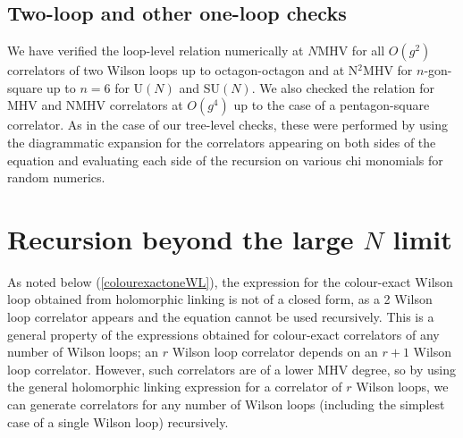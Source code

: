 \documentclass[12pt]{article}
\numberwithin{equation}{section}
\begin{document}
\subsection{Two-loop and other one-loop checks}

We have verified the loop-level relation numerically at $N$MHV for all $O(g^2)$ correlators of two Wilson loops up to octagon-octagon and at N$^2$MHV for $n$-gon-square up to $n=6$ for U$(N)$ and SU$(N)$. We also checked the relation for MHV and NMHV correlators at $O(g^4)$ up to the case of a pentagon-square correlator. As in the case of our tree-level checks, these were performed by using the diagrammatic expansion for the correlators appearing on both sides of the equation and evaluating each side of the recursion on various chi monomials for random numerics. 

\section{Recursion beyond the large \texorpdfstring{$N$}{N} limit}
As noted below (\ref{colourexactoneWL}), the expression for the colour-exact Wilson loop obtained from holomorphic linking is not of a closed form, as a 2 Wilson loop correlator appears and the equation cannot be used recursively. This is a general property of the expressions obtained for colour-exact correlators of any number of Wilson loops; an $r$ Wilson loop correlator depends on an $r+1$ Wilson loop correlator. However, such correlators are of a lower MHV degree, so by using the general holomorphic linking expression for a correlator of $r$ Wilson loops, we can generate correlators for any number of Wilson loops (including the simplest case of a single Wilson loop) recursively.
\end{document}

